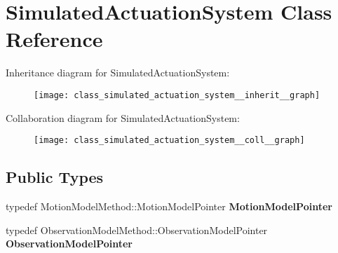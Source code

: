 \hypertarget{class_simulated_actuation_system}{\section{\-Simulated\-Actuation\-System \-Class \-Reference}
\label{class_simulated_actuation_system}
}


\-Inheritance diagram for \-Simulated\-Actuation\-System\-:
\nopagebreak
\begin{figure}[H]
\begin{center}
\leavevmode
\texttt{[image: class\_simulated\_actuation\_system\_\_inherit\_\_graph]}
\end{center}
\end{figure}


\-Collaboration diagram for \-Simulated\-Actuation\-System\-:
\nopagebreak
\begin{figure}[H]
\begin{center}
\leavevmode
\texttt{[image: class\_simulated\_actuation\_system\_\_coll\_\_graph]}
\end{center}
\end{figure}
\subsection*{\-Public \-Types}
\begin{DoxyCompactItemize}
\item 
\hypertarget{class_simulated_actuation_system_a4026d1ead324f05d1c1743024c60d73d}{typedef \*
\-Motion\-Model\-Method\-::\-Motion\-Model\-Pointer {\bfseries \-Motion\-Model\-Pointer}}\label{class_simulated_actuation_system_a4026d1ead324f05d1c1743024c60d73d}

\item 
\hypertarget{class_simulated_actuation_system_a34ed448bdae153ec4719dfc48156be3c}{typedef \*
\-Observation\-Model\-Method\-::\-Observation\-Model\-Pointer {\bfseries \-Observation\-Model\-Pointer}}\label{class_simulated_actuation_system_a34ed448bdae153ec4719dfc48156be3c}

\end{DoxyCompactItemize}
